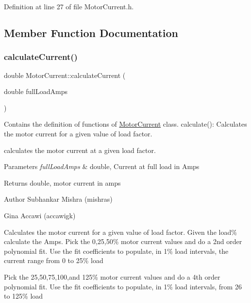 Definition at line 27 of file Motor\+Current.\+h.



\subsection{Member Function Documentation}
\mbox{\label{class_motor_current_aa08b2f8ba065b24908c7e1b80cadb4f6}} 
\subsubsection{\texorpdfstring{calculate\+Current()}{calculateCurrent()}}
{\footnotesize\ttfamily double Motor\+Current\+::calculate\+Current (\begin{DoxyParamCaption}\item[{double}]{full\+Load\+Amps }\end{DoxyParamCaption})}



Contains the definition of functions of \hyperlink{class_motor_current}{Motor\+Current} class. calculate()\+: Calculates the motor current for a given value of load factor. 

calculates the motor current at a given load factor. 
\begin{DoxyParams}{Parameters}
{\em full\+Load\+Amps} & double, Current at full load in Amps \\
\hline
\end{DoxyParams}
\begin{DoxyReturn}{Returns}
double, motor current in amps
\end{DoxyReturn}
\begin{DoxyAuthor}{Author}
Subhankar Mishra (mishras) 

Gina Accawi (accawigk) 
\end{DoxyAuthor}
Calculates the motor current for a given value of load factor. Given the load\% calculate the Amps. Pick the 0,25,50\% motor current values and do a 2nd order polynomial fit. Use the fit coefficients to populate, in 1\% load intervals, the current range from 0 to 25\% load

Pick the 25,50,75,100,and 125\% motor current values and do a 4th order polynomial fit. Use the fit coefficients to populate, in 1\% load intervals, from 26 to 125\% load

